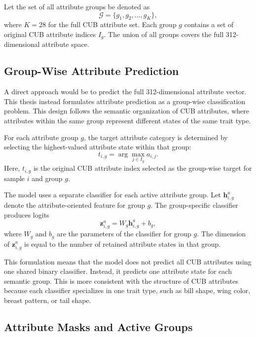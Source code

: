 Let the set of all attribute groups be denoted as
\begin{equation}
    \mathcal{G} = \{g_1, g_2, \ldots, g_K\},
\end{equation}
where \(K=28\) for the full CUB attribute set. Each group \(g\) contains a set of original CUB attribute indices \(I_g\). The union of all groups covers the full 312-dimensional attribute space.

\subsection{Group-Wise Attribute Prediction}

A direct approach would be to predict the full 312-dimensional attribute vector. This thesis instead formulates attribute prediction as a group-wise classification problem. This design follows the semantic organization of CUB attributes, where attributes within the same group represent different states of the same trait type.

For each attribute group \(g\), the target attribute category is determined by selecting the highest-valued attribute state within that group:
\begin{equation}
    t_{i,g}
    =
    \arg\max_{j \in I_g} a_{i,j}.
\end{equation}
Here, \(t_{i,g}\) is the original CUB attribute index selected as the group-wise target for sample \(i\) and group \(g\).

The model uses a separate classifier for each active attribute group. Let \(\mathbf{h}_{i,g}^{a}\) denote the attribute-oriented feature for group \(g\). The group-specific classifier produces logits
\begin{equation}
    \mathbf{z}_{i,g}^{a}
    =
    W_g \mathbf{h}_{i,g}^{a} + b_g,
\end{equation}
where \(W_g\) and \(b_g\) are the parameters of the classifier for group \(g\). The dimension of \(\mathbf{z}_{i,g}^{a}\) is equal to the number of retained attribute states in that group.

This formulation means that the model does not predict all CUB attributes using one shared binary classifier. Instead, it predicts one attribute state for each semantic group. This is more consistent with the structure of CUB attributes because each classifier specializes in one trait type, such as bill shape, wing color, breast pattern, or tail shape.

\subsection{Attribute Masks and Active Groups}

